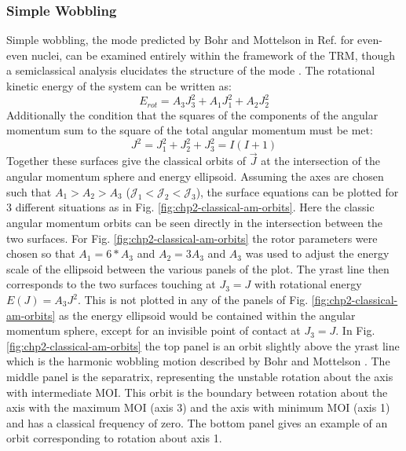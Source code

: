 \subsubsection{Simple Wobbling}
\label{sssec:models-wobbling-simple-wobbling}
Simple wobbling, the mode predicted by Bohr and Mottelson in Ref. \cite{bohrMottelson2} for even-even nuclei, can be examined entirely within the framework of the TRM, though a semiclassical analysis elucidates the structure of the mode \cite{frauendorfTransverseWobbling}. The rotational kinetic energy of the system can be written as:
\begin{equation}
\label{eqn:chp2-rot-kin-en}
E_{rot} = A_3J_3^2 + A_1J_1^2 + A_2J_2^2
\end{equation}
Additionally the condition that the squares of the components of the angular momentum sum to the square of the total angular momentum must be met:
\begin{equation}
\label{eqn:chp2-am-cons}
J^2 = J_1^2 + J_2^2 + J_3^2 = I(I+1)
\end{equation}
Together these surfaces give the classical orbits of $\vec{J}$ at the intersection of the angular momentum sphere and energy ellipsoid. Assuming the axes are chosen such that $A_1>A_2>A_3$ ($\mathcal{J}_1<\mathcal{J}_2<\mathcal{J}_3$), the surface equations can be plotted for 3 different situations as in Fig. \ref{fig:chp2-classical-am-orbits}. Here the classic angular momentum orbits can be seen directly in the intersection between the two surfaces. For Fig. \ref{fig:chp2-classical-am-orbits} the rotor parameters were chosen so that $A_1=6*A_3$ and $A_2=3A_3$ and $A_3$ was used to adjust the energy scale of the ellipsoid between the various panels of the plot. The yrast line then corresponds to the two surfaces touching at $J_3=J$ with rotational energy $E(J)=A_3J^2$. This is not plotted in any of the panels of Fig. \ref{fig:chp2-classical-am-orbits} as the energy ellipsoid would be contained within the angular momentum sphere, except for an invisible point of contact at $J_3=J$. In Fig. \ref{fig:chp2-classical-am-orbits} the top panel is an orbit slightly above the yrast line which is the harmonic wobbling motion described by Bohr and Mottelson \cite{bohrMottelson2}. The middle panel is the separatrix, representing the unstable rotation about the axis with intermediate MOI. This orbit is the boundary between rotation about the axis with the maximum MOI (axis 3) and the axis with minimum MOI (axis 1) and has a classical frequency of zero. The bottom panel gives an example of an orbit corresponding to rotation about axis 1.
